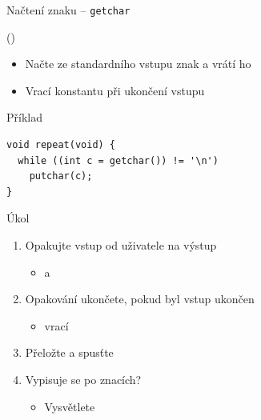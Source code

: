 \begin{frame}[fragile]{Načtení znaku -- \texttt{getchar}}

   ()
  \begin{itemize}
    \item Načte ze standardního vstupu znak a vrátí ho

    \pause

    \item Vrací konstantu  při ukončení vstupu
  \end{itemize}


  \begin{block}{Příklad}
    \begin{lstlisting}
void repeat(void) {
  while ((int c = getchar()) != '\n')
    putchar(c);
}
    \end{lstlisting}
  \end{block}

\end{frame}

\begin{frame}{Úkol}

  \begin{enumerate}
    \item Opakujte vstup od uživatele na výstup
    \begin{itemize}
      \item {} a 
    \end{itemize}

    \item Opakování ukončete, pokud byl vstup ukončen
    \begin{itemize}
      \item {} vrací 
    \end{itemize}

    \item Přeložte a spusťte

    \item Vypisuje se po znacích?
    \begin{itemize}
      \item Vysvětlete
    \end{itemize}
  \end{enumerate}

\end{frame}

